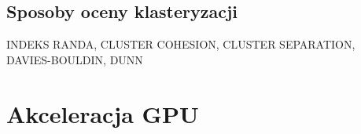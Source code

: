 \subsection{Sposoby oceny klasteryzacji}
INDEKS RANDA, CLUSTER COHESION, CLUSTER SEPARATION, DAVIES-BOULDIN, DUNN

\section{Akceleracja GPU}
\label{sec:akceleracja}